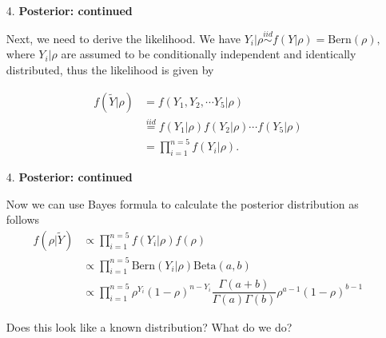 \documentclass[12pt,xcolor=svgnames]{beamer}
\newcommand{\bl}{\color{blue}}
\begin{document}
\begin{frame}
\begin{enumerate}

\item[4. ] {\bf Posterior: continued} 

Next, we need to derive the likelihood. We have $Y_i|\rho   \stackrel{iid}{\sim} f(Y|\rho) = \text{Bern}(\rho),$ where $Y_i|\rho$ are assumed to be {\bl conditionally} independent and identically distributed, thus the likelihood is given by

\begin{align*}
f(\tilde{Y}|\rho) &= f(Y_1, Y_2, \cdots Y_5|\rho)\\
& \stackrel{iid}{=}  f(Y_1|\rho) f(Y_2|\rho)  \cdots f(Y_5|\rho)\\
& = \prod_{i=1}^{n=5} f(Y_i|\rho).
\end{align*}
\end{enumerate}
\end{frame}


\begin{frame}
\begin{enumerate}

\item[4. ] {\bf Posterior: continued} 

Now we can use {\bl Bayes} formula to calculate the posterior distribution as follows
\begin{align*}
f(\rho|\tilde{Y}) &\propto \prod_{i=1}^{n=5} f(Y_i|\rho) f(\rho)\\
&\propto  \prod_{i=1}^{n=5} \text{Bern}(Y_i|\rho)\text{Beta}(a,b)\\
&\propto  \prod_{i=1}^{n=5} \rho^{Y_i} (1- \rho)^{n-Y_i} \dfrac{\Gamma (a+b)}{\Gamma (a)\Gamma (b)} \rho^{a-1} (1-\rho)^{b-1}
\end{align*}

Does this look like a known distribution? What do we do?

\end{enumerate}
\end{frame}
\end{document}
